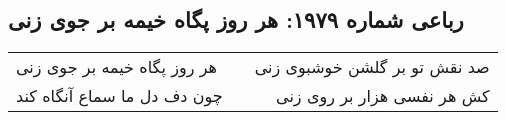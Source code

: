 \begin{center}
\section*{رباعی شماره ۱۹۷۹: هر روز پگاه خیمه بر جوی زنی}
\label{sec:1979}
\begin{longtable}{l p{0.5cm} r}
هر روز پگاه خیمه بر جوی زنی
&&
صد نقش تو بر گلشن خوشبوی زنی
\\
چون دف دل ما سماع آنگاه کند
&&
کش هر نفسی هزار بر روی زنی
\\
\end{longtable}
\end{center}
